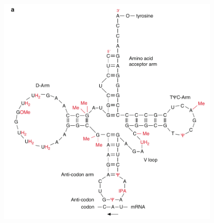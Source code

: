 \documentclass[11pt,ignorenonframetext,aspectratio=169]{beamer}
\begin{document}
\begin{frame}{}
\protect\hypertarget{section-10}{}

\begin{figure}
  \begin{columns}[T,onlytextwidth]

  
  \begin{columns}[T,onlytextwidth]
  \begin{center}
  \includegraphics[width=0.95\linewidth]{../images/ribonucleic_acids_trna.png}
  \end{center}
  

\end{columns}
\end{columns}
\end{figure}
\end{frame}
\end{document}
